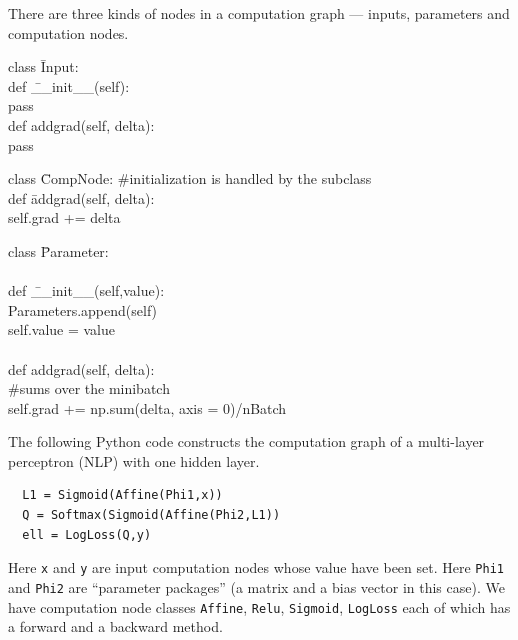 {

There are three kinds of nodes in a computation graph --- inputs, parameters and computation nodes.

\vfill
\begin{tabbing}
class \=Input: \\
    \>def \=\_\_init\_\_(self): \\
        \>\>pass \\
    \>def \>addgrad(self, delta): \\
    \>\>pass
\end{tabbing}

\vfill
\begin{tabbing}
class \=CompNode: \#initialization is handled by the subclass \\
   \>def \=addgrad(self, delta): \\
   \>\>self.grad += delta
\end{tabbing}

\slide{}

\begin{tabbing}
class \=Parameter: \\
    \\
    \>def \=\_\_init\_\_(self,value): \\
        \>\>Parameters.append(self) \\
        \>\>self.value = value \\
\\
    \>def \>addgrad(self, delta): \\
          \>\>\#sums over the minibatch \\
    \>\>self.grad += np.sum(delta, axis = 0)/nBatch \\
\end{tabbing}

\medskip

The following Python code constructs the computation graph of a multi-layer perceptron (NLP) with one hidden layer.

\vfill
\begin{verbatim}
  L1 = Sigmoid(Affine(Phi1,x))
  Q = Softmax(Sigmoid(Affine(Phi2,L1))
  ell = LogLoss(Q,y)
\end{verbatim}

\vfill
Here {\tt x} and {\tt y} are input computation nodes
whose value have been set.
Here {\tt Phi1} and {\tt Phi2} are ``parameter packages'' (a matrix and a bias vector in this case).
We have computation node classes {\tt Affine}, {\tt Relu}, {\tt Sigmoid}, {\tt LogLoss} each of which has
a forward and a backward method.

}
